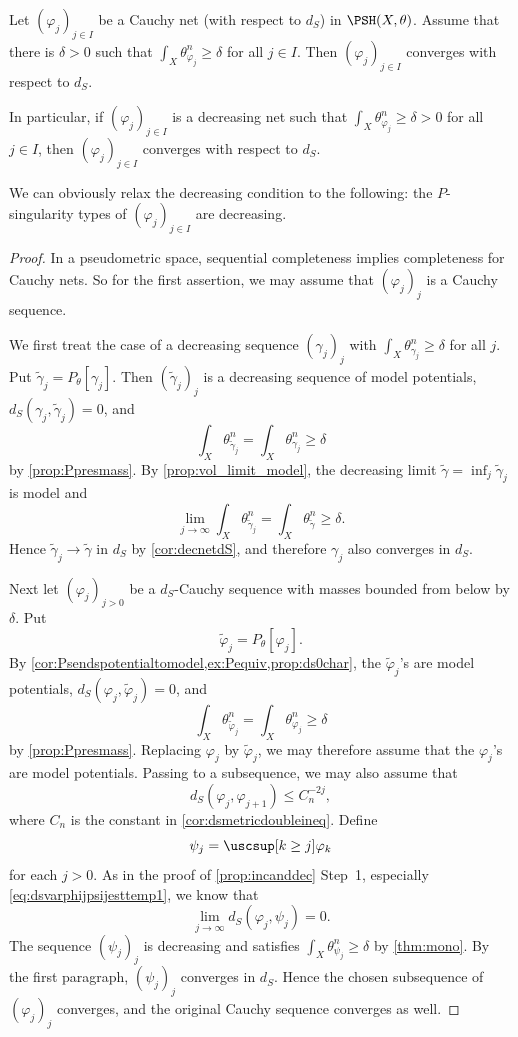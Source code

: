 \begin{corollary}\label{cor:completenessdS}
    Let $(\varphi_j)_{j\in I}$ be a Cauchy net (with respect to $d_S$) in $\PSH(X,\theta)$. Assume that there is $\delta>0$ such that $\int_X \theta_{\varphi_j}^n\geq \delta$ for all $j\in I$. Then $(\varphi_j)_{j\in I}$ converges with respect to $d_S$.

    In particular, if $(\varphi_j)_{j\in I}$ is a decreasing net such that $\int_X \theta_{\varphi_j}^n\geq \delta>0$ for all $j\in I$, then $(\varphi_j)_{j\in I}$ converges with respect to $d_S$.
\end{corollary}
We can obviously relax the decreasing condition to the following: the $P$-singularity types of $(\varphi_j)_{j\in I}$ are decreasing.

\begin{proof}
    In a pseudometric space, sequential completeness implies completeness for Cauchy nets. So for the first assertion, we may assume that $(\varphi_j)_j$ is a Cauchy sequence.

    We first treat the case of a decreasing sequence $(\gamma_j)_j$ with $\int_X\theta_{\gamma_j}^n\geq\delta$ for all $j$. Put $\tilde \gamma_j=P_\theta[\gamma_j]$. Then $(\tilde \gamma_j)_j$ is a decreasing sequence of model potentials, $d_S(\gamma_j,\tilde \gamma_j)=0$, and
    \[
        \int_X\theta_{\tilde \gamma_j}^n=\int_X\theta_{\gamma_j}^n\geq \delta
    \]
    by \cref{prop:Ppresmass}. By \cref{prop:vol_limit_model}, the decreasing limit $\tilde \gamma=\inf_j\tilde \gamma_j$ is model and
    \[
        \lim_{j\to\infty}\int_X\theta_{\tilde \gamma_j}^n=\int_X\theta_{\tilde \gamma}^n\geq\delta.
    \]
    Hence $\tilde \gamma_j\to\tilde \gamma$ in $d_S$ by \cref{cor:decnetdS}, and therefore $\gamma_j$ also converges in $d_S$.

    Next let $(\varphi_j)_{j>0}$ be a $d_S$-Cauchy sequence with masses bounded from below by $\delta$. Put
    \[
        \tilde{\varphi}_j=P_\theta[\varphi_j].
    \]
    By \cref{cor:Psendspotentialtomodel,ex:Pequiv,prop:ds0char}, the $\tilde{\varphi}_j$'s are model potentials, $d_S(\varphi_j,\tilde{\varphi}_j)=0$, and
    \[
        \int_X\theta_{\tilde{\varphi}_j}^n=\int_X\theta_{\varphi_j}^n\geq\delta
    \]
    by \cref{prop:Ppresmass}. Replacing $\varphi_j$ by $\tilde{\varphi}_j$, we may therefore assume that the $\varphi_j$'s are model potentials. Passing to a subsequence, we may also assume that
    \[
        d_S(\varphi_j,\varphi_{j+1})\leq C_n^{-2j},
    \]
    where $C_n$ is the constant in \cref{cor:dsmetricdoubleineq}.
    Define
    \[
    \psi_j=\uscsup[k\geq j]\varphi_k
    \]
    for each $j>0$. As in the proof of \cref{prop:incanddec} Step~1, especially \eqref{eq:dsvarphijpsijesttemp1}, we know that
    \[
    \lim_{j\to\infty} d_S(\varphi_j,\psi_j)=0.
    \]
    The sequence $(\psi_j)_j$ is decreasing and satisfies $\int_X\theta_{\psi_j}^n\geq\delta$ by \cref{thm:mono}. By the first paragraph, $(\psi_j)_j$ converges in $d_S$. Hence the chosen subsequence of $(\varphi_j)_j$ converges, and the original Cauchy sequence converges as well.


\end{proof}
